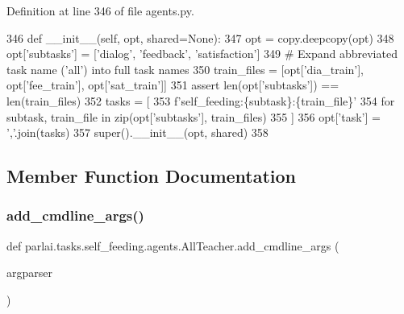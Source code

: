 Definition at line 346 of file agents.\+py.


\begin{DoxyCode}
346     \textcolor{keyword}{def }\_\_init\_\_(self, opt, shared=None):
347         opt = copy.deepcopy(opt)
348         opt[\textcolor{stringliteral}{'subtasks'}] = [\textcolor{stringliteral}{'dialog'}, \textcolor{stringliteral}{'feedback'}, \textcolor{stringliteral}{'satisfaction'}]
349         \textcolor{comment}{# Expand abbreviated task name ('all') into full task names}
350         train\_files = [opt[\textcolor{stringliteral}{'dia\_train'}], opt[\textcolor{stringliteral}{'fee\_train'}], opt[\textcolor{stringliteral}{'sat\_train'}]]
351         \textcolor{keyword}{assert} len(opt[\textcolor{stringliteral}{'subtasks'}]) == len(train\_files)
352         tasks = [
353             f\textcolor{stringliteral}{'self\_feeding:\{subtask\}:\{train\_file\}'}
354             \textcolor{keywordflow}{for} subtask, train\_file \textcolor{keywordflow}{in} zip(opt[\textcolor{stringliteral}{'subtasks'}], train\_files)
355         ]
356         opt[\textcolor{stringliteral}{'task'}] = \textcolor{stringliteral}{','}.join(tasks)
357         super().\_\_init\_\_(opt, shared)
358 
\end{DoxyCode}


\subsection{Member Function Documentation}
\mbox{\label{classparlai_1_1tasks_1_1self__feeding_1_1agents_1_1AllTeacher_aaf96c800f6f56fac5b3c014bb193caa7}} 
\subsubsection{\texorpdfstring{add\+\_\+cmdline\+\_\+args()}{add\_cmdline\_args()}}
{\footnotesize\ttfamily def parlai.\+tasks.\+self\+\_\+feeding.\+agents.\+All\+Teacher.\+add\+\_\+cmdline\+\_\+args (\begin{DoxyParamCaption}\item[{}]{argparser }\end{DoxyParamCaption})\hspace{0.3cm}{\ttfamily [static]}}




